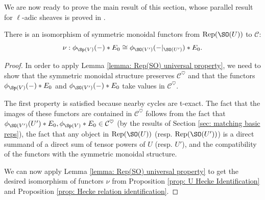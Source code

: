 \documentclass[11pt]{article}
\begin{document}
We are now ready to prove the main result of this section, whose parallel result for $\ell$-adic sheaves is proved in \cite{Lys}.
\begin{proposition}\label{prop: Hecke identification}
    There is an isomorphism of symmetric monoidal functors from $\mathrm{Rep}(\SO(U))$ to $\mathcal{C}$:
    $$\nu: \phi_{\Sp(V)}(-)*E_0\cong \phi_{\SO(V')}(-|_{\SO(U')})*E_0.$$
\end{proposition}
\begin{proof}
    In order to apply Lemma \ref{lemma: Rep(SO) universal property}, we need to show that the symmetric monoidal structure preserves $\mathcal{C}^\heartsuit$ and that the functors $\phi_{\Sp(V)}(-)*E_0$ and $\phi_{\SO(V')}(-)*E_0$ take values in $\mathcal{C}^\heartsuit$.
    
    The first property is satisfied because nearby cycles are t-exact.
    The fact that the images of these functors are contained in $\mathcal{C}^\heartsuit$ follows from the fact that $\phi_{\SO(V')}(U')*E_0, \phi_{\Sp(V)}*E_0\in \mathcal{C}^\heartsuit$ (by the results of Section \ref{sec: matching basic reps}), the fact that any object in $\mathrm{Rep}(\SO(U))$ (resp. $\mathrm{Rep}(\SO(U'))$) is a direct summand of a direct sum of tensor powers of $U$ (resp. $U'$), and the compatibility of the functors with the symmetric monoidal structure.

    We can now apply Lemma \ref{lemma: Rep(SO) universal property} to get the desired isomorphism of functors $\nu$ from Proposition \ref{prop: U Hecke Identification} and Proposition \ref{prop: Hecke relation identification}.
\end{proof}
\end{document}
